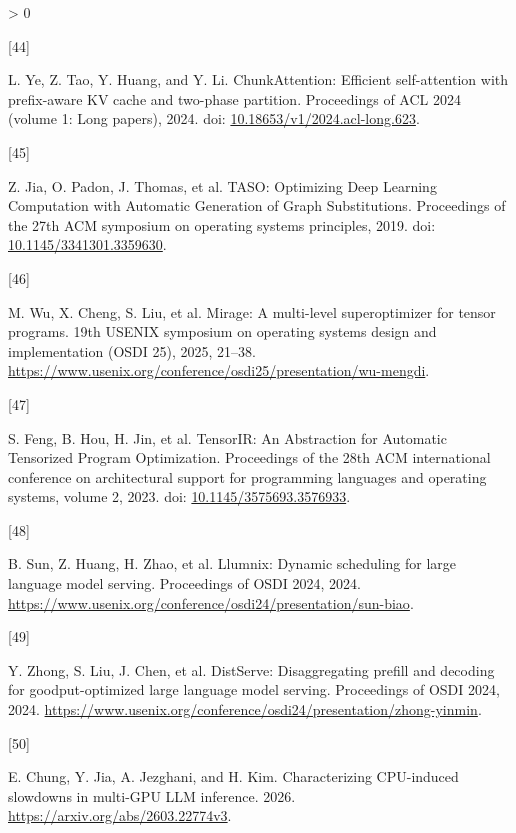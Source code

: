 \documentclass[
  11pt,
  UTF8]{ctexart}
\newlength{\cslhangindent}
\newlength{\csllabelwidth}
\newenvironment{CSLReferences}[2] %
 {%
  \setlength{\parindent}{0pt}
  \ifodd #1 \everypar{\setlength{\hangindent}{\cslhangindent}}\ignorespaces\fi
  \ifnum #2 > 0
  \setlength{\parskip}{#2\baselineskip}
  \fi
 }%
 {}
\newcommand{\CSLLeftMargin}[1]{\parbox[t]{\csllabelwidth}{#1}}
\newcommand{\CSLRightInline}[1]{\parbox[t]{\linewidth - \csllabelwidth}{#1}\break}
\begin{document}
\begin{CSLReferences}{0}{0}
\leavevmode{}%
\CSLLeftMargin{{[}44{]} }
\CSLRightInline{L. Ye, Z. Tao, Y. Huang, and Y. Li. ChunkAttention:
Efficient self-attention with prefix-aware KV cache and two-phase
partition. Proceedings of ACL 2024 (volume 1: Long papers), 2024. doi:
\href{https://doi.org/10.18653/v1/2024.acl-long.623}{10.18653/v1/2024.acl-long.623}.}

\leavevmode{}%
\CSLLeftMargin{{[}45{]} }
\CSLRightInline{Z. Jia, O. Padon, J. Thomas, et al. {TASO: Optimizing
Deep Learning Computation with Automatic Generation of Graph
Substitutions}. Proceedings of the 27th ACM symposium on operating
systems principles, 2019. doi:
\href{https://doi.org/10.1145/3341301.3359630}{10.1145/3341301.3359630}.}

\leavevmode{}%
\CSLLeftMargin{{[}46{]} }
\CSLRightInline{M. Wu, X. Cheng, S. Liu, et al. Mirage: A multi-level
superoptimizer for tensor programs. 19th USENIX symposium on operating
systems design and implementation (OSDI 25), 2025, 21--38.
\url{https://www.usenix.org/conference/osdi25/presentation/wu-mengdi}.}

\leavevmode{}%
\CSLLeftMargin{{[}47{]} }
\CSLRightInline{S. Feng, B. Hou, H. Jin, et al. {TensorIR: An
Abstraction for Automatic Tensorized Program Optimization}. Proceedings
of the 28th ACM international conference on architectural support for
programming languages and operating systems, volume 2, 2023. doi:
\href{https://doi.org/10.1145/3575693.3576933}{10.1145/3575693.3576933}.}

\leavevmode{}%
\CSLLeftMargin{{[}48{]} }
\CSLRightInline{B. Sun, Z. Huang, H. Zhao, et al. Llumnix: Dynamic
scheduling for large language model serving. Proceedings of OSDI 2024,
2024.
\url{https://www.usenix.org/conference/osdi24/presentation/sun-biao}.}

\leavevmode{}%
\CSLLeftMargin{{[}49{]} }
\CSLRightInline{Y. Zhong, S. Liu, J. Chen, et al. DistServe:
Disaggregating prefill and decoding for goodput-optimized large language
model serving. Proceedings of OSDI 2024, 2024.
\url{https://www.usenix.org/conference/osdi24/presentation/zhong-yinmin}.}

\leavevmode{}%
\CSLLeftMargin{{[}50{]} }
\CSLRightInline{E. Chung, Y. Jia, A. Jezghani, and H. Kim.
Characterizing CPU-induced slowdowns in multi-GPU LLM inference. 2026.
\url{https://arxiv.org/abs/2603.22774v3}.}


\end{CSLReferences}
\end{document}
